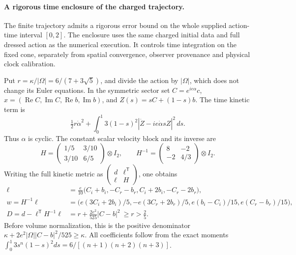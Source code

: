 \paragraph{A rigorous time enclosure of the charged trajectory.}
The finite trajectory admits a rigorous error bound on the whole supplied
action-time interval \([0,2]\). The enclosure uses the same charged initial
data and full dressed action as the numerical execution. It controls time
integration on the fixed cone, separately from spatial convergence,
observer provenance and physical clock calibration.

Put \(r=\kappa/|\Omega|=6/(7+3\sqrt5)\), and divide the action by
\(|\Omega|\), which does not change its Euler equations. In the symmetric
sector set \(C=e^{ie\alpha}c\),
\(x=(\operatorname{Re}C,\operatorname{Im}C,
\operatorname{Re}b,\operatorname{Im}b)\), and \(Z(s)=sC+(1-s)b\).
The time kinetic term is
\[
 \tfrac12r\dot\alpha^2+
 \int_0^1 3(1-s)^2\left|\dot Z-ie\dot\alpha sZ\right|^2\,ds.
\]
Thus \(\alpha\) is cyclic. The constant scalar velocity block and
its inverse are
\[
 H=\begin{pmatrix}1/5&3/10\\3/10&6/5\end{pmatrix}\otimes I_2,
 \qquad H^{-1}=\begin{pmatrix}8&-2\\-2&4/3\end{pmatrix}\otimes I_2.
\]
Writing the full kinetic metric as
\(\left(\begin{smallmatrix}d&\ell^{\mathsf T}\\\ell&H\end{smallmatrix}\right)\),
one obtains
\begin{align*}
 \ell&=\frac e{10}\bigl(C_i+b_i,-C_r-b_r,C_i+2b_i,-C_r-2b_r\bigr),\\
 w=H^{-1}\ell&=\bigl(e(3C_i+2b_i)/5,-e(3C_r+2b_r)/5,
                         e(b_i-C_i)/15,e(C_r-b_r)/15\bigr),\\
 D=d-\ell^{\mathsf T}H^{-1}\ell
   &=r+\frac{2e^2}{525}|C-b|^2\ \geq r>\frac25.
\end{align*}
Before volume normalization, this is the positive denominator
\(\kappa+2e^2|\Omega||C-b|^2/525\geq\kappa\).
All coefficients follow from the exact moments
\(\int_0^1 3s^n(1-s)^2ds=6/[(n+1)(n+2)(n+3)]\).

